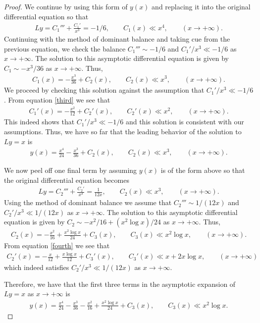\documentclass[12pt]{article}
\theoremstyle{definition}
\begin{document}
\begin{proof}
  We continue by using this form of $y(x)$ and replacing it into the original differential equation so that
  \begin{align*}
    Ly = C_1''' + \frac{C_1'}{x^3} = -1/6, \qquad C_1(x) \ll x^4, \qquad (x\to+\infty).
  \end{align*}
  Continuing with the method of dominant balance and taking cue from the previous equation,
  we check the balance $C_1''' \sim -1/6$ and $C_1'/x^3 \ll -1/6$ as $x\to + \infty$.
  The solution to this asymptotic differential equation is given by $C_1 \sim - x^3/36$ as $x\to + \infty$. Thus,
  \begin{align}\label{third}
    C_1(x) = -\frac{x^3}{36} + C_2(x), \qquad C_2(x) \ll x^3, \qquad (x\to+\infty).
  \end{align}
  We proceed by checking this solution against the assumption that $C_1'/x^3 \ll -1/6$. From equation \eqref{third} we see that
  \begin{align*}
    C_1'(x) = -\frac{x^2}{12} + C_2'(x), \qquad C_2'(x) \ll x^2, \qquad (x\to+\infty).
  \end{align*}
  This indeed shows that $C_1' / x^3 \ll -1/6$ and this solution is consistent with our assumptions.
  Thus, we have so far that the leading behavior of the solution to $Ly=x$ is
  \begin{align*}
    y(x) = \frac{x^4}{24} - \frac{x^3}{36} + C_2(x), \qquad C_2(x) \ll x^3, \qquad (x\to+\infty).
  \end{align*}

  We now peel off one final term by assuming $y(x)$ is of the form above so that the original
  differential equation becomes
  \begin{align*}
    Ly = C_2''' + \frac{C_2'}{x^3} = \frac{1}{12x}, \qquad C_2(x) \ll x^3, \qquad (x\to+\infty).
  \end{align*}
  Using the method of dominant balance we assume that $C_2''' \sim 1/(12x)$ and $C_2'/x^3 \ll 1/(12x)$ as $x\to + \infty$.
  The solution to this asymptotic differential equation is given by $C_2 \sim -x^2/16 +(x^2\log x)/24$ as $x\to + \infty$. Thus,
  \begin{align}\label{fourth}
    C_2(x) = -\frac{x^2}{16} +\frac{x^2\log x}{24} + C_3(x), \qquad C_3(x) \ll x^2\log x, \qquad (x\to+\infty).
  \end{align}
  From equation \eqref{fourth} we see that
  \begin{align*}
    C_2'(x) =-\frac{x}{12} + \frac{x\log x}{12} + C_3'(x), \qquad C_3'(x) \ll x + 2x\log x, \qquad (x\to+\infty)
  \end{align*}
  which indeed satisfies $C_2'/x^3 \ll 1/(12x)$ as $x\to + \infty$.

  Therefore, we have that the first three terms in the asymptotic expansion of $Ly = x$ as $x \to +\infty$ is
  \begin{align*}
    y(x) = \frac{x^4}{24} - \frac{x^3}{36} -\frac{x^2}{16} +\frac{x^2\log x}{24} + C_3(x), \qquad C_3(x) \ll x^2\log x.
  \end{align*}
\end{proof}
\end{document}
